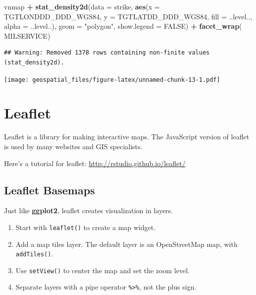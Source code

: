 \documentclass[oneside]{memoir}
\newenvironment{Shaded}{\begin{snugshade}}{\end{snugshade}}
\newcommand{\KeywordTok}[1]{\textcolor[rgb]{0.13,0.29,0.53}{\textbf{#1}}}
\newcommand{\DataTypeTok}[1]{\textcolor[rgb]{0.13,0.29,0.53}{#1}}
\newcommand{\StringTok}[1]{\textcolor[rgb]{0.31,0.60,0.02}{#1}}
\newcommand{\OtherTok}[1]{\textcolor[rgb]{0.56,0.35,0.01}{#1}}
\newcommand{\OperatorTok}[1]{\textcolor[rgb]{0.81,0.36,0.00}{\textbf{#1}}}
\newcommand{\NormalTok}[1]{#1}
\theoremstyle{definition}
\theoremstyle{definition}
\theoremstyle{definition}
\theoremstyle{remark}
\begin{document}
\begin{Shaded}
\begin{Highlighting}[]
\NormalTok{vnmap }\OperatorTok{+}
\StringTok{  }\KeywordTok{stat_density2d}\NormalTok{(}\DataTypeTok{data =}\NormalTok{ strike, }\KeywordTok{aes}\NormalTok{(}\DataTypeTok{x =}\NormalTok{ TGTLONDDD_DDD_WGS84, }\DataTypeTok{y =}\NormalTok{ TGTLATDD_DDD_WGS84,}
                                    \DataTypeTok{fill =}\NormalTok{ ..level.., }\DataTypeTok{alpha =}\NormalTok{ ..level..),}
                 \DataTypeTok{geom =} \StringTok{"polygon"}\NormalTok{, }\DataTypeTok{show.legend =} \OtherTok{FALSE}\NormalTok{) }\OperatorTok{+}
\StringTok{  }\KeywordTok{facet_wrap}\NormalTok{(}\OperatorTok{~}\StringTok{ }\NormalTok{MILSERVICE)}
\end{Highlighting}
\end{Shaded}

\begin{verbatim}
## Warning: Removed 1378 rows containing non-finite values (stat_density2d).
\end{verbatim}

\texttt{[image: geospatial\_files/figure-latex/unnamed-chunk-13-1.pdf]}

\chapter{Leaflet}\label{leaflet}

Leaflet is a library for making interactive maps. The JavaScript version
of leaflet is used by many websites and GIS specialists.

Here's a tutorial for leaflet: \url{http://rstudio.github.io/leaflet/}

\section{Leaflet Basemaps}\label{leaflet-basemaps}

Just like \textbf{ggplot2}, leaflet creates visualization in layers.

\begin{enumerate}
\def\labelenumi{\arabic{enumi}.}
\item
  Start with \texttt{leaflet()} to create a map widget.
\item
  Add a map tiles layer. The default layer is an OpenStreetMap map, with
  \texttt{addTiles()}.
\item
  Use \texttt{setView()} to center the map and set the zoom level.
\item
  Separate layers with a pipe operator \texttt{\%\textgreater{}\%}, not
  the plus sign.
\end{enumerate}
\end{document}
